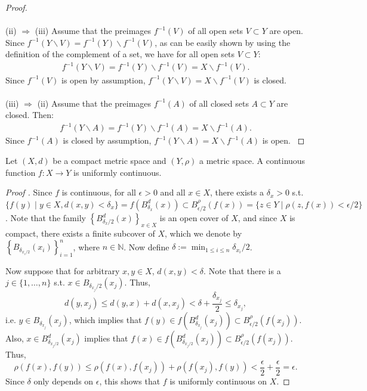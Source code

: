 \begin{proof}
	\\ 
	\\
	(ii) $\Rightarrow$ (iii) Assume that the preimages $f^{-1}(V)$ of all open sets $V\subset Y$ are open. Since $f^{-1}(Y\backslash V) = f^{-1}(Y)\backslash f^{-1}(V)$, as can be easily shown by using the definition of the complement of a set, we have for all open sets $V \subset Y$: 
	\begin{align}
		f^{-1}(Y\backslash V) = f^{-1}(Y)\backslash f^{-1}(V) = X\backslash f^{-1}(V). 
	\end{align}
	Since $f^{-1}(V)$ is open by assumption, $f^{-1}(Y\backslash V) = X\backslash f^{-1}(V)$ is closed. 
	\\ 
	\\
	(iii) $\Rightarrow$ (ii) Assume that the preimages $f^{-1}(A)$
	of all closed sets $A\subset Y$ are closed. Then: 
	\begin{align}
		f^{-1}(Y\backslash A) = f^{-1}(Y)\backslash f^{-1}(A) = X\backslash f^{-1}(A). 
	\end{align}
	Since $f^{-1}(A)$ is closed by assumption, $f^{-1}(Y\backslash A) = X\backslash f^{-1}(A)$ is open. \cite{preimage-of-closed-sets}
\end{proof} 

\begin{theorem}\label{thrm:cont_func_on_comp_metric_space_uniformly_continuous}
	Let $(X, d)$ be a compact metric space and $(Y, \rho)$ a metric space. A continuous function $f: X\to Y$ is uniformly continuous. 
\end{theorem}

\begin{proof}[Proof \cite{1605098}]
	Since $f$ is continuous, for all $\epsilon > 0$ and all $x\in X$, there exists a $\delta_x > 0$ s.t. $\{f(y)\mid y\in X, d(x, y) < \delta_x\} = f\left(B^{d}_{\delta_x}(x)\right) \subset B^{\rho}_{\epsilon/2}(f(x)) = \{z\in Y\mid \rho(z, f(x)) < \epsilon/2\}$. Note that the family $\left\{B_{\delta_x/2}^{d}(x)\right\}_{x\in X}$ is an open cover of $X$, and since $X$ is compact, there exists a finite subcover of $X$, which we denote by $\left\{B_{\delta_{x_i/2}}(x_i)\right\}_{i=1}^{n}$, where $n\in\mathbb N$. Now define $\delta := \min_{1 \leq i \leq n}\delta_{x_i}/2$.
	
	Now suppose that for arbitrary $x, y\in X$, $d(x, y) < \delta$. Note that there is a $j \in \{1, \dots, n\}$ s.t. $x\in B_{\delta_{x_{j}}/2}(x_{j})$. Thus, $$d(y, x_j)\leq d(y, x) + d(x, x_j) < \delta + \frac{\delta_{x_j}}{2} \leq \delta_{x_j},$$ i.e. $y\in B_{\delta_{x_j}}(x_j)$, which implies that $f(y)\in f\left(B^{d}_{\delta_{x_j}}(x_j)\right) \subset B_{\epsilon/2}^{\rho}(f(x_j))$. Also, $x\in B^{d}_{\delta_{x_j/2}}(x_j)$ implies that $f(x)\in f\left(B^{d}_{\delta_{x_j/2}}(x_j)\right) \subset B_{\epsilon/2}^{\rho}(f(x_j))$. Thus, $$\rho(f(x), f(y)) \leq \rho(f(x), f(x_j)) + \rho(f(x_j), f(y)) < \frac{\epsilon}{2} + \frac{\epsilon}{2} = \epsilon.$$ Since $\delta$ only depends on $\epsilon$, this shows that $f$ is uniformly continuous on $X$.
\end{proof}

